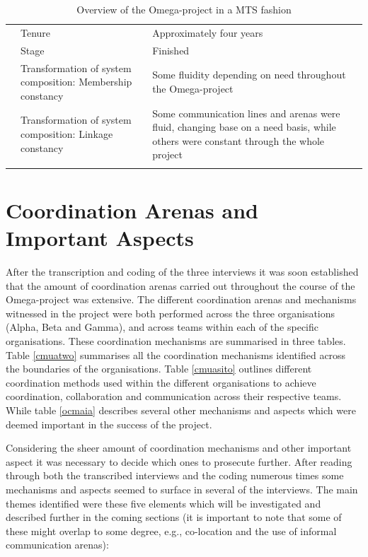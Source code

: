 \begin{center}
\begin{longtable}{ | p{2.5cm} | p{4cm} | p{8cm} | }
	& Tenure & Approximately four years \\ \cline{2-3}
	& Stage & Finished \\ \cline{2-3}
	& Transformation of system composition: Membership constancy & Some fluidity depending on need throughout the Omega-project \\ \cline{2-3}
	& Transformation of system composition: Linkage constancy & Some communication lines and arenas were fluid, changing base on a need basis, while others were constant through the whole project \\ \cline{2-3}
	\hline
\caption{Overview of the Omega-project in a MTS fashion}
\label{ootopiamf}
\end{longtable}
\end{center}

\section{Coordination Arenas and Important Aspects}

After the transcription and coding of the three interviews it was soon established that the amount of coordination arenas carried out throughout the course of the Omega-project was extensive. The different coordination arenas and mechanisms witnessed in the project were both performed across the three organisations (Alpha, Beta and Gamma), and across teams within each of the specific organisations. These coordination mechanisms are summarised in three tables. Table \ref{cmuatwo} summarises all the coordination mechanisms identified across the boundaries of the organisations. Table \ref{cmuasito} outlines different coordination methods used within the different organisations to achieve coordination, collaboration and communication across their respective teams. While table \ref{ocmaia} describes several other mechanisms and aspects which were deemed important in the success of the project.

Considering the sheer amount of coordination mechanisms and other important aspect it was necessary to decide which ones to prosecute further. After reading through both the transcribed interviews and the coding numerous times some mechanisms and aspects seemed to surface in several of the interviews. The main themes identified were these five elements which will be investigated and described further in the coming sections (it is important to note that some of these might overlap to some degree, e.g., co-location and the use of informal communication arenas):

